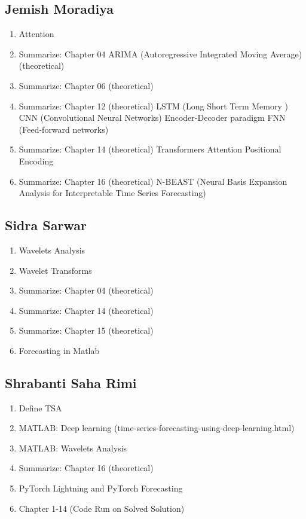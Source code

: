 \documentclass{article}
\begin{document}
\subsection{Jemish Moradiya}
\begin{enumerate}
    \item Attention
    \item Summarize: Chapter 04 ARIMA (Autoregressive Integrated Moving Average) 
(theoretical)
    \item Summarize: Chapter 06 (theoretical)
    \item Summarize: Chapter 12 (theoretical)
                LSTM (Long Short Term Memory )
	        CNN (Convolutional Neural Networks)
	        Encoder-Decoder paradigm
	        FNN (Feed-forward networks)

    \item Summarize: Chapter 14 (theoretical)
        Transformers
        Attention
        Positional Encoding

    \item Summarize: Chapter 16 (theoretical)
        N-BEAST (Neural Basis Expansion Analysis for Interpretable Time Series Forecasting)
\end{enumerate}

\subsection{Sidra Sarwar}
\begin{enumerate}
    \item Wavelets Analysis
    \item Wavelet Transforms
    \item Summarize: Chapter 04 (theoretical)
    \item Summarize: Chapter 14 (theoretical)
    \item Summarize: Chapter 15 (theoretical)
    \item Forecasting in Matlab
\end{enumerate}

\subsection{Shrabanti Saha Rimi}
\begin{enumerate}
    \item Define TSA
    \item MATLAB: Deep learning (time-series-forecasting-using-deep-learning.html)
    \item MATLAB: Wavelets Analysis
    \item Summarize: Chapter 16 (theoretical)
    \item PyTorch Lightning and PyTorch Forecasting
    \item Chapter 1-14 (Code Run on Solved Solution)
    
\end{enumerate}




\end{document}
